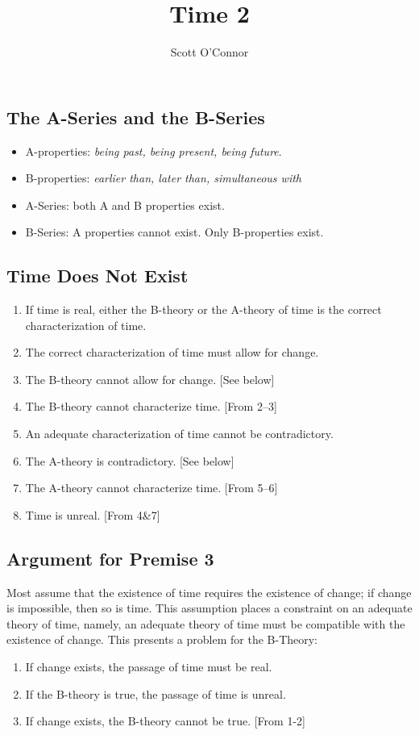 \documentclass[]{article}
\title{Time 2}
\author{Scott O’Connor}
\begin{document}
\maketitle

\subsection*{The A-Series and the B-Series}

\begin{itemize} 
\item A-properties: \emph{being past, being present, being future}.
\item B-properties: \emph{earlier than, later than, simultaneous with}
\item A-Series: both A and B properties exist. 
\item B-Series: A properties cannot exist. Only B-properties exist. 
\end{itemize}


\subsection*{Time Does Not Exist}

\begin{enumerate}
\item If time is real, either the B-theory or the A-theory of time is the correct characterization of time. 
\item The correct characterization of time must allow for change. 
\item The B-theory cannot allow for change. [See below]
\item The B-theory cannot characterize time. [From 2--3]
\item An adequate characterization of time cannot be contradictory. 
\item The A-theory is contradictory. [See below]
\item The A-theory cannot characterize time. [From 5--6] 
\item Time is unreal. [From 4\&7]
\end{enumerate}



\subsection*{Argument for Premise 3}
Most assume that the existence of time requires the existence of change; if change is impossible, then so is time. This assumption places a constraint on an adequate theory of time, namely, an adequate theory of time must be compatible with the existence of change. This presents a problem for the B-Theory: 
\begin{enumerate}
\item If change exists, the passage of time must be real.
\item If the B-theory is true, the passage of time is unreal.
\item If change exists, the B-theory cannot be true. [From 1-2]
\end{enumerate} 
\end{document}
